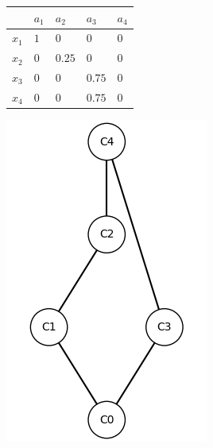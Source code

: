 \documentclass[runningheads,a4paper]{llncs}
\begin{document}
\begin{example}
\begin{figure}
	\vspace{0.3cm}
	\begin{minipage}{\textwidth}
		\begin{minipage}{0.35\textwidth}
			\centering
			\begin{tabular}{w{c}{20pt} || w{c}{20pt} | w{c}{20pt} || w{c}{20pt} | w{c}{20pt}}
				& $a_1$ & $a_2$ & $a_3$ & $a_4$ \\\hline\hline
				$x_1$ & $1$ & $0$ & $0$ & $0$ \\\hline
				$x_2$ & $0$ & $0.25$ & $0$ & $0$ \\\hline\hline
				$x_3$ & $0$ & $0$ & $0.75$ & $0$ \\\hline
				$x_4$ & $0$ & $0$ & $0.75$ & $0$
			\end{tabular}
		\end{minipage}
		\hspace{1cm}
		\begin{minipage}{0.2\textwidth}
			\centering
			\includegraphics[height = \textwidth]{im/ex-ma2-other-contexts-3.png}
		\end{minipage}
		\begin{minipage}{0.1\textwidth}
			\centering

\end{minipage}
\end{minipage}
\end{figure}
\end{example}
\end{document}
